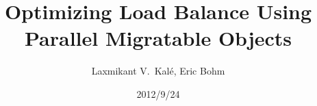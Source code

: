 \documentclass{beamer}
\title[Load Balancing]{Optimizing Load Balance Using Parallel Migratable Objects}
\institute[UIUC]{Parallel Programming Laboratory \\University of Illinois Urbana-Champaign}
\author{Laxmikant V.~Kal\'e, Eric Bohm}
\date{2012/9/24}
\begin{document}
\frame{\titlepage}



\end{document}
